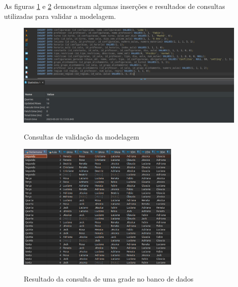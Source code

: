 As figuras \ref{fig:sqlValidacao} e \ref{fig:consultaGrade} demonstram algumas inserções e resultados de consultas utilizadas para validar a modelagem.

\begin{figure}[h]
	\centering
	\caption{Consultas de validação da modelagem}
	\includegraphics[width=1\textwidth]{./dados/figuras/sql_validacao}
	\label{fig:sqlValidacao}
\end{figure}

\begin{figure}[h]
	\centering
	\caption{Resultado da consulta de uma grade no banco de dados}
	\includegraphics[width=0.7\textwidth]{./dados/figuras/ConsultaGrade}
	\label{fig:consultaGrade}
\end{figure}